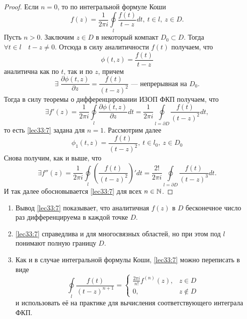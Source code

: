 \documentclass[../../main.tex]{subfiles}
\begin{document}
\begin{proof}
	Если $n=0$, то по интегральной формуле Коши
	\[
	f(z) = \frac{1}{2\pi i} \oint \limits_l
	\frac{f(t)}{t-z} dt,\ t \in l,\ z \in D.
	\]
	Пусть $n > 0$.
	Заключим $z \in D$ в некоторый компакт $D_0 \subset D$. Тогда
	$\forall t \in l\quad t - z \neq 0.$
	Отсюда в силу аналитичности $f(t)$ получаем, что
	\begin{equation}
	\label{lec33:9}
	\phi(t, z) = \frac{f(t)}{t-z} 
	\end{equation}
	аналитична как по $t$, так и по $z$, причем
	\[
	\exists\; \frac{\partial \phi(t, z)}{\partial z}
	= \frac{f(t)}{(t-z)^2}
	\text{~--- непрерывная на } D_0.
	\]
	Тогда в силу теоремы о дифференцировании ИЗОП ФКП
	получаем, что 
	\begin{equation}
	\label{lec33:10}
	\exists f'(z) = \frac{1}{2\pi i} \oint\limits_{l}
	\frac{\partial \phi(t, z)}{\partial z} dt = 
	\frac{1}{2\pi i} \oint\limits_{l = \partial D}\frac{f(t)}{(t-z)^2} 
	dt,
	\end{equation}
	то есть \eqref{lec33:7} задана для $n = 1$.
	Рассмотрим далее 
	\[
	\phi_1(t, z) = \frac{f(t)}{(t-z)^2},\ t \in l_0, \
	z \in D_0
	\]
	Снова получим, как и выше, что 
	\[
	\exists f''(z) = \frac{1}{2\pi i} \oint\limits_{l}
	\left( \frac{f(t)}{(t-z)^2} \right)' dt =
	\frac{2!}{2\pi i} \oint\limits_{l = \partial D}
	\frac{f(t)}{(t-z)^3} dt.
	\]
	И так далее обосновывается \eqref{lec33:7} для всех $n \in \mathbb{N}$.
\end{proof}
\begin{rems}

\;

\begin{enumerate}
	\item Вывод \eqref{lec33:7} показывает, что аналитичная $f(z)$ в 
	$D$ бесконечное число раз дифференцируема в каждой точке
	$D$.
	\item \eqref{lec33:7} справедлива и для многосвязных
	областей, но при этом под $l$ понимают полную границу $D$.
	
	\item Как и в случае интегральной формулы Коши, 
	\eqref{lec33:7} можно переписать в виде 
	\[
	\oint\limits_l \frac{f(t)}{(t-z)^{n+1}} = 
	\begin{cases}
	\frac{2\pi i}{n!} f^{(n)}(z),& z \in D \\
	0,& z \notin D
	\end{cases}
	\]
	и использовать её на практике для вычисления
	соответствующего интеграла ФКП.
\end{enumerate}

\end{rems}
\end{document}
